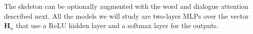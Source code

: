 
The \HGRU skeleton can be optionally augmented with the
word and dialogue attention described next. All the models we will study are two-layer MLPs over the
vector $\bm{H}_n$ that use a ReLU hidden layer and a softmax layer
for the outputs.

